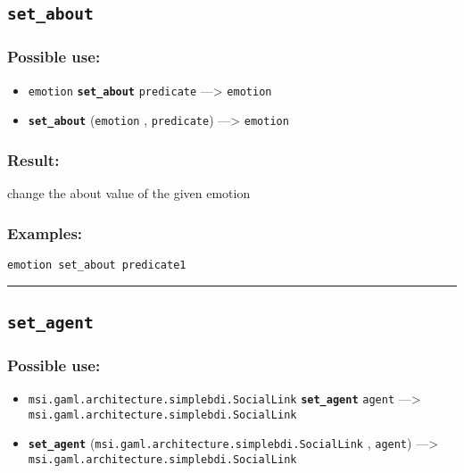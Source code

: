 \documentclass[]{book}
\providecommand{\tightlist}{%
  \setlength{\itemsep}{0pt}\setlength{\parskip}{0pt}}
\theoremstyle{definition}
\theoremstyle{definition}
\theoremstyle{definition}
\theoremstyle{remark}
\begin{document}
\subsection{\texorpdfstring{\texttt{set\_about}}{set\_about}}\label{set_about}

\subsubsection{Possible use:}\label{possible-use-454}

\begin{itemize}
\tightlist
\item
  \texttt{emotion} \textbf{\texttt{set\_about}} \texttt{predicate}
  ---\textgreater{} \texttt{emotion}
\item
  \textbf{\texttt{set\_about}} (\texttt{emotion} , \texttt{predicate})
  ---\textgreater{} \texttt{emotion}
\end{itemize}

\subsubsection{Result:}\label{result-438}

change the about value of the given emotion

\subsubsection{Examples:}\label{examples-311}

\begin{verbatim}
emotion set_about predicate1 
\end{verbatim}

\begin{center}\rule{0.5\linewidth}{\linethickness}\end{center}

\subsection{\texorpdfstring{\texttt{set\_agent}}{set\_agent}}\label{set_agent}

\subsubsection{Possible use:}\label{possible-use-455}

\begin{itemize}
\tightlist
\item
  \texttt{msi.gaml.architecture.simplebdi.SocialLink}
  \textbf{\texttt{set\_agent}} \texttt{agent} ---\textgreater{}
  \texttt{msi.gaml.architecture.simplebdi.SocialLink}
\item
  \textbf{\texttt{set\_agent}}
  (\texttt{msi.gaml.architecture.simplebdi.SocialLink} , \texttt{agent})
  ---\textgreater{} \texttt{msi.gaml.architecture.simplebdi.SocialLink}
\end{itemize}
\end{document}
